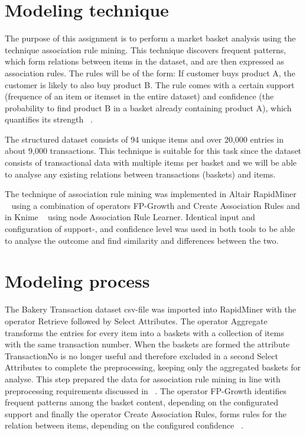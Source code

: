 \label{chap:modeling}

\section{Modeling technique}
The purpose of this assignment is to perform a market basket analysis using the technique
association rule mining. This technique discovers frequent patterns, which form relations
between items in the dataset, and are then expressed as association rules. The rules will
be of the form: If customer buys product A, the customer is likely to also buy product B.
The rule comes with a certain support (frequence of an item or itemset in the entire dataset)
and confidence (the probability to find product B in a basket already containing product A), which 
quantifies its strength ~\cite[Ch.~5, Sec.~5.2]{courseLitt}.

The structured dataset consists of 94 unique items and over 20,000 entries in about 9,000 transactions.
This technique is suitable for this task since the dataset consists of transactional data with
multiple items per basket and we will be able to analyse any existing relations between
transactions (baskets) and items. 

The technique of association rule mining was implemented in Altair RapidMiner ~\cite{RapidMiner} using a combination
of operators FP-Growth and Create Association Rules and in Knime ~\cite{Knime} using node Association Rule Learner.
Identical input and configuration of support-, and confidence level was used in both tools to be
able to analyse the outcome and find similarity and differences between the two.

\section{Modeling process}
The Bakery Transaction dataset csv-file was imported into RapidMiner with the operator Retrieve
followed by Select Attributes. The operator Aggregate transforms the entries for every item into
a baskets with a collection of items with the same transaction number. When the baskets are formed
the attribute TransactionNo is no longer useful and therefore excluded in a second Select Attributes
to complete the preprocessing, keeping only the aggregated baskets for analyse. This step prepared 
the data for association rule mining in line with preprocessing requirements discussed in 
~\cite[Ch.~3, Sec.~3.3]{courseLitt}. The operator FP-Growth identifies frequent patterns among the basket content, 
depending on the configurated support and finally the operator Create Association Rules, forms rules for 
the relation between items, depending on the configured confidence ~\cite[Ch.~5, Sec.~5.2]{courseLitt}.

